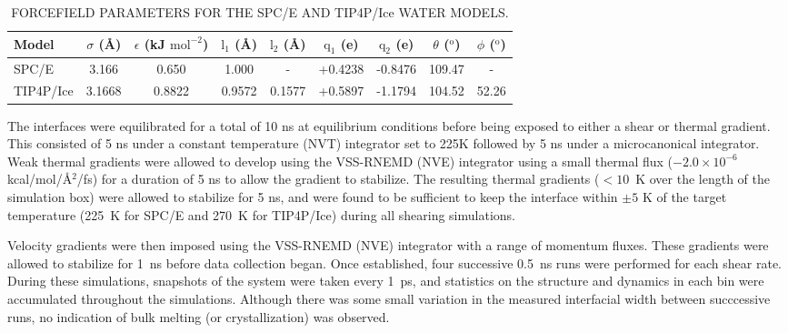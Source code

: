 \begin{table}[H]
\centering
\caption{FORCEFIELD PARAMETERS FOR THE SPC/E AND TIP4P/Ice WATER MODELS.}
\label{tab:waterModels}
\begin{tabular}{|l|c|c|c|c|c|c|c|c|} 
\hline
  Model &  $\sigma$ (\AA) & $\epsilon$ (kJ $\mathrm{mol}^{-2}$) &
                                                              $\mathrm{l}_{1}$
                                                              (\AA) &
                                                                    $\mathrm{l}_{2}$
                                                                      (\AA)
  & $\mathrm{q}_{1}$ (e) & $\mathrm{q}_{2}$ (e) & $\theta$
                                                  ($^{\mathrm{o}}$) &
                                                                      $\phi$ ($^{\mathrm{o}}$) \\ \hline
  SPC/E & 3.166 & 0.650 & 1.000 & - & +0.4238 & -0.8476 & 109.47 & - \\
  TIP4P/Ice & 3.1668 & 0.8822 & 0.9572 & 0.1577 & +0.5897 & -1.1794 &
  104.52 & 52.26 \\
\hline
\end{tabular}
\end {table}


The interfaces were equilibrated for a total of 10 ns at equilibrium
conditions before being exposed to either a shear or thermal gradient.
This consisted of 5 ns under a constant temperature (NVT) integrator
set to 225K followed by 5 ns under a microcanonical integrator.  Weak
thermal gradients were allowed to develop using the VSS-RNEMD (NVE)
integrator using a small thermal flux ($-2.0\times 10^{-6}$
kcal/mol/\AA$^2$/fs) for a duration of 5 ns to allow the gradient to
stabilize.  The resulting thermal gradients ($< 10$~K over the length
of the simulation box) were allowed to stabilize for 5 ns, and were
found to be sufficient to keep the interface within $\pm 5$ K of the
target temperature (225~K for SPC/E and 270~K for TIP4P/Ice) during
all shearing simulations.


Velocity gradients were then imposed using the VSS-RNEMD (NVE)
integrator with a range of momentum fluxes.  These gradients were
allowed to stabilize for 1~ns before data collection began. Once
established, four successive 0.5~ns runs were performed for each shear
rate.  During these simulations, snapshots of the system were taken
every 1~ps, and statistics on the structure and dynamics in each bin
were accumulated throughout the simulations.  Although there was some
small variation in the measured interfacial width between succcessive
runs, no indication of bulk melting (or crystallization) was observed.





